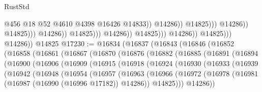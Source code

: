 \begin{lexlean}{RustStd}
\begin{coremodule}
                                                              @456
                                                              @18
                                                              @52
                                                              @4610
                                                              @4398
                                                              @16426
                                                              @14833))
                                                          @14286))
                                                      @14825)))
                                                @14286))
                                            @14825)))
                                      @14286))
                                  @14825)))
                            @14286))
                        @14825)))
                  @14286))
              @14825)))
        @14286))
    @14825
@17230 := @16834
    (@16837
      (@16843
        (@16846
          (@16852
            (@16858
              (@16861
                (@16867
                  (@16870
                    (@16876
                      (@16882
                        (@16885
                          (@16891
                            (@16894
                              (@16900
                                (@16906
                                  (@16909
                                    (@16915
                                      (@16918
                                        (@16924
                                          (@16930
                                            (@16933
                                              (@16939
                                                (@16942
                                                  (@16948
                                                    (@16954
                                                      (@16957
                                                        (@16963
                                                          (@16966
                                                            (@16972
                                                              (@16978
                                                                (@16981
                                                                  (@16987
                                                                    (@16990 (@16996 @17182))
                                                                    @14286))
                                                                @14825)))
                                                          @14286))

\end{coremodule}
\end{lexlean}
